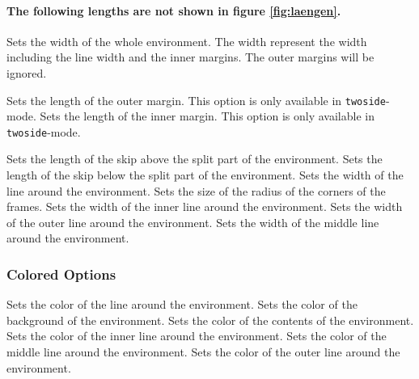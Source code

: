 \documentclass[parskip=false,english,11pt]{ltxmdf}
\begin{document}
\paragraph*{The following lengths are not shown in figure \eqref{fig:laengen}.}

\mbox{}
 Sets the width of the whole \mdname environment. The width represent the width including the line width and the inner margins. The outer margins will be ignored.

 Sets the length of the outer margin. This option is only available in \texttt{twoside}-mode.
 Sets the length of the inner margin. This option is only available in \texttt{twoside}-mode.


 Sets the length of the skip above the split part of the environment.
 Sets the length of the skip below the split part of the environment.
 Sets the width of the line around the environment.
 Sets the size of the radius of the corners of the frames.
 Sets the width of the inner line around the environment.
                                     \limitation
{} Sets the width of the outer line around the environment.
                                      \limitation
{} Sets the width of the middle line around the environment.\limitation


\subsubsection{Colored Options}
 Sets the color of the line around the environment.
 Sets the color of the background of the environment.
 Sets the color of the contents of the environment.
 Sets the color of the inner line around the environment.
                                        \limitation
{} Sets the color of the middle line around the environment. \limitation
{} Sets the color of the outer line around the environment.\limitation
\end{document}
